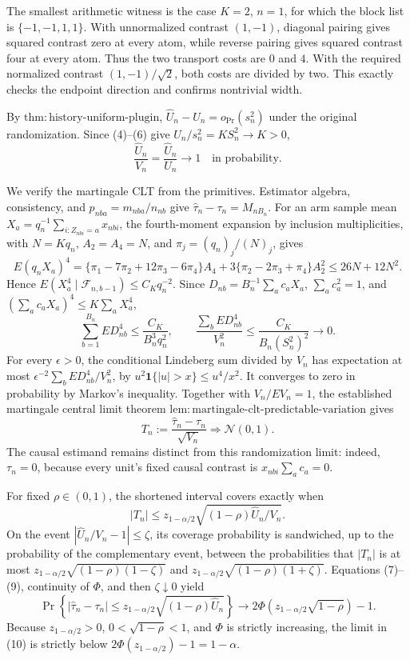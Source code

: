 The smallest arithmetic witness is the case \(K=2\), \(n=1\), for which the block list is \(\{-1,-1,1,1\}\). With unnormalized contrast \((1,-1)\), diagonal pairing gives squared contrast zero at every atom, while reverse pairing gives squared contrast four at every atom. Thus the two transport costs are \(0\) and \(4\). With the required normalized contrast \((1,-1)/\sqrt2\), both costs are divided by two. This exactly checks the endpoint direction and confirms nontrivial width.

By \(\mathrm{thm:history\text{-}uniform\text{-}plugin}\),
\(\widehat U_n-U_n=o_{\Pr}(s_n^2)\) under the original randomization. Since (4)--(6) give \(U_n/s_n^2=KS_n^2\to K>0\),
\[
\frac{\widehat U_n}{V_n}=\frac{\widehat U_n}{U_n}\longrightarrow1
\quad\text{in probability}.
\tag{7}
\]

We verify the martingale CLT from the primitives. Estimator algebra, consistency, and \(p_{nba}=m_{nba}/n_{nb}\) give \(\widehat\tau_n-\tau_n=M_{nB_n}\). For an arm sample mean
\(X_a=q_n^{-1}\sum_{i:Z_{nbi}=a}x_{nbi}\), the fourth-moment expansion by inclusion multiplicities, with \(N=Kq_n\), \(A_2=A_4=N\), and \(\pi_j=(q_n)_j/(N)_j\), gives
\[
E(q_nX_a)^4
=\{\pi_1-7\pi_2+12\pi_3-6\pi_4\}A_4
+3\{\pi_2-2\pi_3+\pi_4\}A_2^2
\le26N+12N^2.
\]
Hence \(E(X_a^4\mid\mathcal F_{n,b-1})\le C_Kq_n^{-2}\). Since
\(D_{nb}=B_n^{-1}\sum_ac_aX_a\), \(\sum_ac_a^2=1\), and
\((\sum_ac_aX_a)^4\le K\sum_aX_a^4\),
\[
\sum_{b=1}^{B_n}ED_{nb}^4
\le\frac{C_K}{B_n^3q_n^2},
\qquad
\frac{\sum_bED_{nb}^4}{V_n^2}
\le\frac{C_K}{B_n(S_n^2)^2}\longrightarrow0.
\tag{8}
\]
For every \(\epsilon>0\), the conditional Lindeberg sum divided by \(V_n\) has expectation at most \(\epsilon^{-2}\sum_bED_{nb}^4/V_n^2\), by
\(u^2\mathbf1\{|u|>x\}\le u^4/x^2\). It converges to zero in probability by Markov's inequality. Together with \(V_n/EV_n=1\), the established martingale central limit theorem
\(\mathrm{lem:martingale\text{-}clt\text{-}predictable\text{-}variation}\) gives
\[
T_n:=\frac{\widehat\tau_n-\tau_n}{\sqrt{V_n}}
\Rightarrow\mathcal N(0,1).
\tag{9}
\]
The causal estimand remains distinct from this randomization limit: indeed,
\(\tau_n=0\), because every unit's fixed causal contrast is
\(x_{nbi}\sum_ac_a=0\).

For fixed \(\rho\in(0,1)\), the shortened interval covers exactly when
\[
|T_n|\le z_{1-\alpha/2}
\sqrt{(1-\rho)\widehat U_n/V_n}.
\]
On the event \(|\widehat U_n/V_n-1|\le\zeta\), its coverage probability is sandwiched, up to the probability of the complementary event, between the probabilities that \(|T_n|\) is at most
\(z_{1-\alpha/2}\sqrt{(1-\rho)(1-\zeta)}\) and
\(z_{1-\alpha/2}\sqrt{(1-\rho)(1+\zeta)}\). Equations (7)--(9), continuity of \(\Phi\), and then \(\zeta\downarrow0\) yield
\[
\Pr\!\left\{|\widehat\tau_n-\tau_n|\le z_{1-\alpha/2}
\sqrt{(1-\rho)\widehat U_n}\right\}
\longrightarrow
2\Phi\!\left(z_{1-\alpha/2}\sqrt{1-\rho}\right)-1.
\tag{10}
\]
Because \(z_{1-\alpha/2}>0\), \(0<\sqrt{1-\rho}<1\), and \(\Phi\) is strictly increasing, the limit in (10) is strictly below
\(2\Phi(z_{1-\alpha/2})-1=1-\alpha\).

